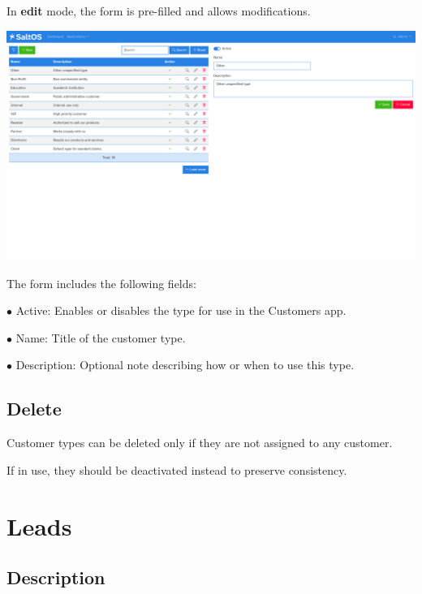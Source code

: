 \documentclass[a4paper]{article}
\begin{document}
In \textbf{edit} mode, the form is pre-filled and allows modifications.

\begin{center}\includegraphics[width=1\textwidth]{../ujest/snaps/test-screenshots-js-screenshots-crm-customers-types-edit-10-en-us-1-snap.png}\end{center}

The form includes the following fields:

\begin{compactitem}
\item[\color{myblue}$\bullet$] Active: Enables or disables the type for use in the Customers app.
\item[\color{myblue}$\bullet$] Name: Title of the customer type.
\item[\color{myblue}$\bullet$] Description: Optional note describing how or when to use this type.
\end{compactitem}

\hypertarget{toc55}{}
\subsection{Delete}

Customer types can be deleted only if they are not assigned to any customer.

If in use, they should be deactivated instead to preserve consistency.


\hypertarget{toc56}{}
\section{Leads}

\hypertarget{toc57}{}
\subsection{Description}
\end{document}
